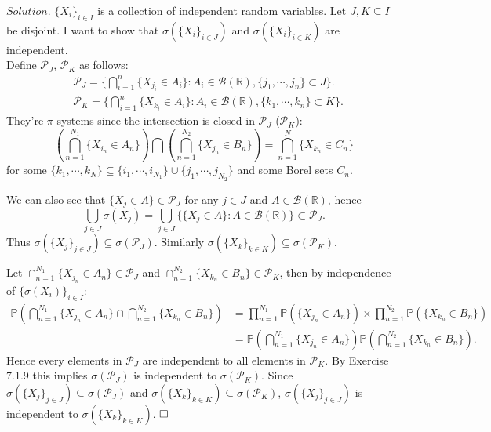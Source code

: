\noindent$Solution.$
$\{X_i\}_{i\in I}$ is a collection of independent random variables. Let $J,K\subseteq I$ be disjoint. I want to show that $\sigma(\{X_i\}_{i\in J})$ and $\sigma(\{X_i\}_{i\in K})$ are independent.\\
Define $\mathcal{P}_J$, $\mathcal{P}_K$ as follows:
\begin{align*}
    &\mathcal{P}_J=\Big\{\bigcap_{i=1}^n\{X_{j_i}\in A_i\}:A_i\in\mathcal{B}(\mathbb{R}), \{j_1,\cdots,j_n\}\subset J\Big\}.\\
    &\mathcal{P}_K=\Big\{\bigcap_{i=1}^n\{X_{k_i}\in A_i\}:A_i\in\mathcal{B}(\mathbb{R}), \{k_1,\cdots,k_n\}\subset K\Big\}.
\end{align*}
They're $\pi$-systems since the intersection is closed in $\mathcal{P}_J$ ($\mathcal{P}_K$):
\begin{equation*}
    \left(\bigcap_{n=1}^{N_1}\{X_{i_n}\in A_n\}\right)\bigcap\left(\bigcap_{n=1}^{N_2}\{X_{j_n}\in B_n\}\right)=\bigcap_{n=1}^{N}\{X_{k_n}\in C_n\}
\end{equation*}
for some $\{k_1,\cdots,k_N\}\subseteq\{i_1,\cdots,i_{N_1}\}\cup\{j_1,\cdots,j_{N_2}\}$ and some Borel sets $C_n$.

We can also see that $\{X_j\in A\}\in\mathcal{P}_J$ for any $j\in J$ and $A\in\mathcal{B}(\mathbb{R})$, hence
\begin{equation*}
    \bigcup_{j\in J}\sigma(X_j)=\bigcup_{j\in J}\Big\{\{X_j\in A\}:A\in\mathcal{B}(\mathbb{R})\Big\}\subset\mathcal{P}_J.
\end{equation*}
Thus $\sigma(\{X_j\}_{j\in J})\subseteq\sigma(\mathcal{P}_J)$. Similarly $\sigma(\{X_k\}_{k\in K})\subseteq\sigma(\mathcal{P}_K)$.

Let $\cap_{n=1}^{N_1}\{X_{j_n}\in A_n\}\in\mathcal{P}_{J}$ and $\cap_{n=1}^{N_2}\{X_{k_n}\in B_n\}\in\mathcal{P}_{K}$, then by independence of $\{\sigma(X_i)\}_{i\in I}$:
\begin{align*}
    \mathbb{P}\left(\bigcap_{n=1}^{N_1}\{X_{j_n}\in A_n\}\cap\bigcap_{n=1}^{N_2}\{X_{k_n}\in B_n\}\right)&=\prod_{n=1}^{N_1}\mathbb{P}(\{X_{j_n}\in A_n\})\times\prod_{n=1}^{N_2}\mathbb{P}(\{X_{k_n}\in B_n\}) \\
    &=\mathbb{P}\left(\bigcap_{n=1}^{N_1}\{X_{j_n}\in A_n\}\right)\mathbb{P}\left(\bigcap_{n=1}^{N_2}\{X_{k_n}\in B_n\}\right).
\end{align*}
Hence every elements in $\mathcal{P}_J$ are independent to all elements in $\mathcal{P}_K$. By Exercise 7.1.9 this implies $\sigma(\mathcal{P}_J)$ is independent to $\sigma(\mathcal{P}_K)$. Since $\sigma(\{X_j\}_{j\in J})\subseteq\sigma(\mathcal{P}_J)$ and $\sigma(\{X_k\}_{k\in K})\subseteq\sigma(\mathcal{P}_K)$, $\sigma(\{X_j\}_{j\in J})$ is independent to $\sigma(\{X_k\}_{k\in K})$.
$\hspace{\fill}\square$\\

